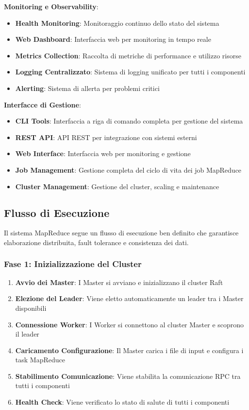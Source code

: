 \documentclass[12pt,a4paper]{article}
\begin{document}
\textbf{Monitoring e Observability}:
\begin{itemize}
\item \textbf{Health Monitoring}: Monitoraggio continuo dello stato del sistema
\item \textbf{Web Dashboard}: Interfaccia web per monitoring in tempo reale
\item \textbf{Metrics Collection}: Raccolta di metriche di performance e utilizzo risorse
\item \textbf{Logging Centralizzato}: Sistema di logging unificato per tutti i componenti
\item \textbf{Alerting}: Sistema di allerta per problemi critici
\end{itemize}

\textbf{Interfacce di Gestione}:
\begin{itemize}
\item \textbf{CLI Tools}: Interfaccia a riga di comando completa per gestione del sistema
\item \textbf{REST API}: API REST per integrazione con sistemi esterni
\item \textbf{Web Interface}: Interfaccia web per monitoring e gestione
\item \textbf{Job Management}: Gestione completa del ciclo di vita dei job MapReduce
\item \textbf{Cluster Management}: Gestione del cluster, scaling e maintenance
\end{itemize}

\subsection{Flusso di Esecuzione}

Il sistema MapReduce segue un flusso di esecuzione ben definito che garantisce elaborazione distribuita, fault tolerance e consistenza dei dati.

\subsubsection{Fase 1: Inizializzazione del Cluster}

\begin{enumerate}
\item \textbf{Avvio dei Master}: I Master si avviano e inizializzano il cluster Raft
\item \textbf{Elezione del Leader}: Viene eletto automaticamente un leader tra i Master disponibili
\item \textbf{Connessione Worker}: I Worker si connettono al cluster Master e scoprono il leader
\item \textbf{Caricamento Configurazione}: Il Master carica i file di input e configura i task MapReduce
\item \textbf{Stabilimento Comunicazione}: Viene stabilita la comunicazione RPC tra tutti i componenti
\item \textbf{Health Check}: Viene verificato lo stato di salute di tutti i componenti
\end{enumerate}
\end{document}
